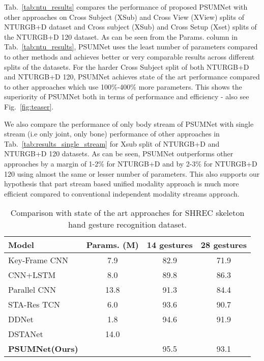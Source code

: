 \documentclass[runningheads]{llncs}
\begin{document}
Tab.~\ref{tab:ntu_results} compares the performance of proposed PSUMNet with other approaches on Cross Subject (XSub) and Cross View (XView) splits of NTURGB+D dataset \cite{Shahroudy_2016_CVPR} and Cross subject (XSub) and Cross Setup (Xset) splits of the NTURGB+D 120 dataset\cite{Liu_2019_NTURGBD120}. As can be seen from the Params. column in Tab.~\ref{tab:ntu_results}, PSUMNet uses the least number of parameters compared to other methods and achieves better or very comparable results across different splits of the datasets. For the harder Cross Subject split of both NTURGB+D and NTURGB+D 120, PSUMNet achieves state of the art performance compared to other approaches which use 100\%-400\% more parameters. This shows the superiority of PSUMNet both in terms of performance and efficiency - also see Fig.~\ref{fig:teaser}.

We also compare the performance of only body stream of PSUMNet with single stream (i.e only joint, only bone) performance of other approaches in Tab.~\ref{tab:results_single_stream} for Xsub split of NTURGB+D and NTURGB+D 120 datasets. As can  be seen, PSUMNet outperforms other approaches by a margin of 1-2\% for NTURGB+D and by 2-3\% for NTURGB+D 120 using almost the same or lesser number of parameters. This also supports our hypothesis that part stream based unified modality approach is much more efficient compared to conventional independent modality streams approach.



\begin{table}[!t]
  \resizebox{0.75\linewidth}{!} 
    {\begin{tabular}{l|c|cc}
    \toprule
Model & Params. (M) &  14 gestures & 28 gestures\\
    \midrule
    Key-Frame CNN \cite{de20173d} & 7.9 & 82.9 & 71.9 \\
    CNN+LSTM \cite{nunez2018convolutional} & 8.0 & 89.8 & 86.3 \\
    Parallel CNN\cite{devineau2018convolutional} & 13.8 & 91.3 & 84.4\\
    STA-Res TCN \cite{hou2018spatial} & 6.0 & 93.6 & 90.7\\
    DDNet \cite{yang2019make} & 1.8 & 94.6 & 91.9\\
    DSTANet \cite{dstanet_accv2020} & 14.0 &  &  \\
    \midrule
    \textbf{PSUMNet(Ours)} &  & 95.5 & 93.1\\
  \bottomrule
\end{tabular}
}
\caption{\label{tab:shrec_results}Comparison with state of the art approaches for SHREC skeleton hand gesture recognition dataset.}
  
\end{table}
\end{document}
